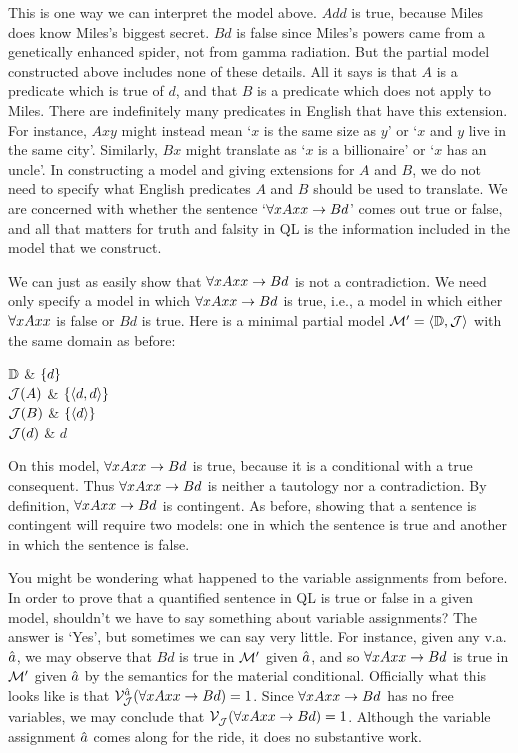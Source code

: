 This is one way we can interpret the model above.
$Add$ is true, because Miles does know Miles's biggest secret.
$Bd$ is false since Miles's powers came from a genetically enhanced spider, not from gamma radiation.
But the partial model constructed above includes none of these details.
All it says is that $A$ is a predicate which is true of $d$, and that $B$ is a predicate which does not apply to Miles.
There are indefinitely many predicates in English that have this extension.
For instance, $Axy$ might instead mean `$x$ is the same size as $y$' or `$x$ and $y$ live in the same city'.
Similarly, $Bx$ might translate as `$x$ is a billionaire' or `$x$ has an uncle'.
In constructing a model and giving extensions for $A$ and $B$, we do not need to specify what English predicates $A$ and $B$ should be used to translate.
We are concerned with whether the sentence `$\forall xAxx \rightarrow Bd$' comes out true or false, and all that matters for truth and falsity in QL is the information included in the model that we construct.

We can just as easily show that $\forall xAxx \rightarrow Bd$ is not a contradiction.
We need only specify a model in which $\forall xAxx \rightarrow Bd$ is true, i.e., a model in which either $\forall x Axx$ is false or $Bd$ is true.
Here is a minimal partial model $\mathcal{M}'=\langle\mathbb{D},\mathcal{J}\rangle$ with the same domain as before:

\begin{partialmodel}
  $\mathbb{D}$			& $\lbrace d\rbrace$\\
	$\mathcal{J}(A)$ 	& $\lbrace\langle d,d\rangle\rbrace$\\
  $\mathcal{J}(B)$	  & $\lbrace\langle d\rangle\rbrace$\\
	$\mathcal{J}(d)$	  & $d$
\end{partialmodel}

On this model, $\forall xAxx \rightarrow Bd$ is true, because it is a conditional with a true consequent.
Thus $\forall xAxx \rightarrow Bd$ is neither a tautology nor a contradiction.
By definition, $\forall xAxx \rightarrow Bd$ is contingent.
As before, showing that a sentence is contingent will require two models: one in which the sentence is true and another in which the sentence is false.

You might be wondering what happened to the variable assignments from before.
In order to prove that a quantified sentence in QL is true or false in a given model, shouldn't we have to say something about variable assignments?
The answer is `Yes', but sometimes we can say very little.
For instance, given any v.a. $\hat{a}$, we may observe that $Bd$ is true in $\mathcal{M}'$ given $\hat{a}$, and so $\forall xAxx \rightarrow Bd$ is true in $\mathcal{M}'$ given $\hat{a}$ by the semantics for the material conditional.
Officially what this looks like is that $\mathcal{V}_{\mathcal{J}}^{\hat{a}}(\forall xAxx \rightarrow Bd)=1$.
Since $\forall xAxx \rightarrow Bd$ has no free variables, we may conclude that $\mathcal{V}_{\mathcal{J}}^{}(\forall xAxx \rightarrow Bd)=1$. 
Although the variable assignment $\hat{a}$ comes along for the ride, it does no substantive work.

